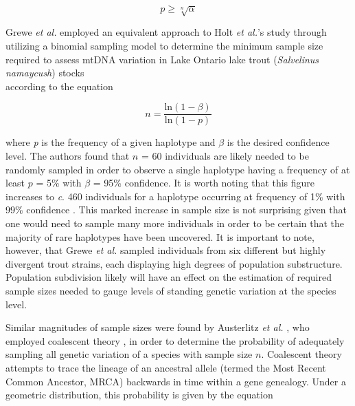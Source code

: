 \begin{equation}
p \geq \sqrt[n]{\alpha}
\end{equation}

\vspace{5mm}

Grewe \textit{et al.} \cite{grewe1993mitochondrial} employed an equivalent approach to Holt \textit{et al.}'s \cite{holt2007experimental} study through utilizing a binomial sampling model to determine the minimum sample size required to assess mtDNA variation in Lake Ontario lake trout (\textit{Salvelinus namaycush}) stocks \\ according to the equation

\begin{equation}
n=\frac{\textrm{ln}(1 - \beta)}{\textrm{ln}(1 - p)}
\end{equation}

\vspace{5mm}

\noindent where \textit{p} is the frequency of a given haplotype and $\beta$ is the desired confidence level. The authors found that $n$ = 60 individuals are likely needed to be randomly sampled in order to observe a single haplotype having a frequency of at least $p$ = 5\% with $\beta$ = 95\% confidence. It is worth noting that this figure increases to \textit{c}. 460 individuals for a haplotype occurring at frequency of 1\% with 99\% confidence \cite{grewe1993mitochondrial}. This marked increase in sample size is not surprising given that one would need to sample many more individuals in order to be certain that the majority of rare haplotypes have been uncovered. It is important to note, however, that Grewe \textit{et al.} \cite{grewe1993mitochondrial} sampled individuals from six different but highly divergent trout strains, each displaying high degrees of population substructure. Population subdivision likely will have an effect on the estimation of required sample sizes needed to gauge levels of standing genetic variation at the species level. 

\vspace{5mm}

Similar magnitudes of sample sizes were found by Austerlitz \textit{et al.} \cite{austerlitz2009dna}, who employed coalescent theory \cite{kingman1982coalescent}, in order to determine the probability of adequately sampling all genetic variation of a species with sample size $n$. Coalescent theory attempts to trace the lineage of an ancestral allele (termed the Most Recent Common Ancestor, MRCA) backwards in time within a gene genealogy. Under a geometric distribution, this probability is given by the equation \cite{austerlitz2009dna}

